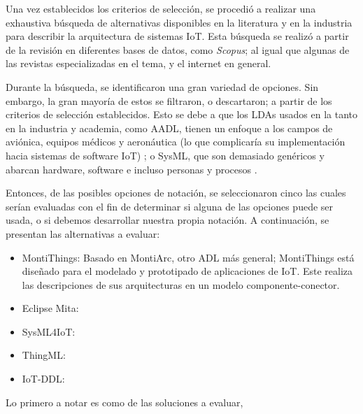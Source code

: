 Una vez establecidos los criterios de selección, se procedió a realizar una exhaustiva búsqueda de alternativas disponibles en la literatura y en la industria para describir la arquitectura de sistemas IoT. Esta búsqueda se realizó a partir de la revisión en diferentes bases de datos, como \textit{Scopus}; al igual que algunas de las revistas especializadas en el tema, y el internet en general.

Durante la búsqueda, se identificaron una gran variedad de opciones. Sin embargo, la gran mayoría de estos se filtraron, o descartaron; a partir de los criterios de selección establecidos. Esto se debe a que los LDAs usados en la tanto en la industria y academia, como AADL, tienen un enfoque a los campos de aviónica, equipos médicos y aeronáutica (lo que complicaría su implementación hacia sistemas de software IoT) \cite{aadl_web, aadl_pdf}; o SysML, que son demasiado genéricos y abarcan hardware, software e incluso personas y procesos \cite{omgsysml_2015}.

Entonces, de las posibles opciones de notación, se seleccionaron cinco las cuales serían evaluadas con el fin de determinar si alguna de las opciones puede ser usada, o si debemos desarrollar nuestra propia notación. A continuación, se presentan las alternativas a evaluar:

\begin{itemize}
    \item MontiThings: Basado en MontiArc, otro ADL más general; MontiThings está diseñado para el modelado y prototipado de aplicaciones de IoT. Este realiza las descripciones de sus arquitecturas en un modelo componente-conector. 
    \item Eclipse Mita:
    \item SysML4IoT:
    \item ThingML:
    \item IoT-DDL:
\end{itemize}

Lo primero a notar es como de las soluciones a evaluar, 




